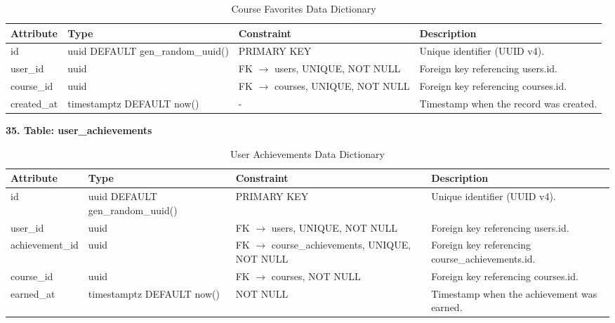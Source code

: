 \documentclass[12pt, oneside]{article} %
\newcommand{\tabbreak}{\hyphenpenalty=200\exhyphenpenalty=200\tolerance=4000\hbadness=10000\hspace{0pt}}
\begin{document}
\begin{table}[H]
\caption{Course Favorites Data Dictionary}
\label{tab:dd_course_favorites}
\vspace{-4mm}
\begin{center}
\renewcommand{\arraystretch}{1.15}
\scriptsize
\begin{tabular}{|>{\raggedright\arraybackslash\tabbreak}p{2.67cm}|>{\raggedright\arraybackslash\tabbreak}p{2.93cm}|>{\raggedright\arraybackslash\tabbreak}p{2.67cm}|>{\raggedright\arraybackslash\tabbreak}p{4.51cm}|}
\hline
\textbf{Attribute} & \textbf{Type} & \textbf{Constraint} & \textbf{Description} \\ \hline
id & uuid DEFAULT gen\_random\_uuid() & PRIMARY KEY & Unique identifier (UUID v4). \\ \hline
user\_id & uuid & FK $\rightarrow$ users, UNIQUE, NOT NULL & Foreign key referencing users.id. \\ \hline
course\_id & uuid & FK $\rightarrow$ courses, UNIQUE, NOT NULL & Foreign key referencing courses.id. \\ \hline
created\_at & timestamptz DEFAULT now() & - & Timestamp when the record was created. \\ \hline
\end{tabular}
\end{center}
\end{table}

\textbf{35. Table: user\_achievements}

\begin{table}[H]
\caption{User Achievements Data Dictionary}
\label{tab:dd_user_achievements}
\vspace{-4mm}
\begin{center}
\renewcommand{\arraystretch}{1.15}
\scriptsize
\begin{tabular}{|>{\raggedright\arraybackslash\tabbreak}p{2.67cm}|>{\raggedright\arraybackslash\tabbreak}p{2.93cm}|>{\raggedright\arraybackslash\tabbreak}p{2.67cm}|>{\raggedright\arraybackslash\tabbreak}p{4.51cm}|}
\hline
\textbf{Attribute} & \textbf{Type} & \textbf{Constraint} & \textbf{Description} \\ \hline
id & uuid DEFAULT gen\_random\_uuid() & PRIMARY KEY & Unique identifier (UUID v4). \\ \hline
user\_id & uuid & FK $\rightarrow$ users, UNIQUE, NOT NULL & Foreign key referencing users.id. \\ \hline
achievement\_id & uuid & FK $\rightarrow$ course\_achievements, UNIQUE, NOT NULL & Foreign key referencing course\_achievements.id. \\ \hline
course\_id & uuid & FK $\rightarrow$ courses, NOT NULL & Foreign key referencing courses.id. \\ \hline
earned\_at & timestamptz DEFAULT now() & NOT NULL & Timestamp when the achievement was earned. \\ \hline
\end{tabular}
\end{center}
\end{table}
\end{document}
